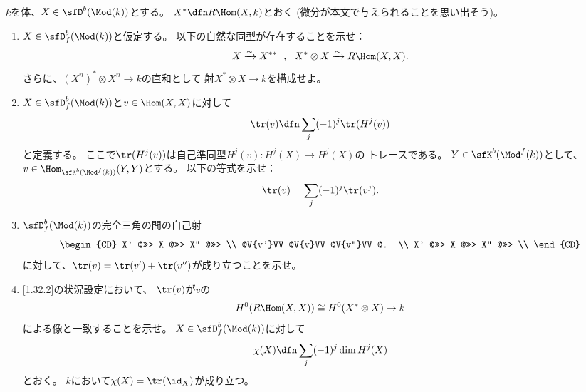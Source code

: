 \documentclass[uplatex,dvipdfmx]{jsarticle}
\begin{document}
\maketitle\HeaderCommentA
\section{}
\fi



\begin{prob}\label{1.32}
  \(k\)を体、\(X\in \sfD^b(\Mod(k))\)とする。
  \(X^*\dfn R\Hom(X,k)\)とおく
  (微分が本文\cite[Remark 1.8.11]{kashiwara2002sheaves}で与えられることを思い出そう)。
  \begin{enumerate}
    \item \label{1.32.1}
    \(X\in \sfD^b_f(\Mod(k))\)と仮定する。
    以下の自然な同型が存在することを示せ：
    \[
    X\xrightarrow{\sim}X^{**} \ \ , \ \
    X^*\otimes X \xrightarrow{\sim} R\Hom(X,X).
    \]
    さらに、\((X^n)^*\otimes X^n \to k\)の直和として
    射\(X^*\otimes X\to k\)を構成せよ。
    \item \label{1.32.2}
    \(X\in \sfD^b_f(\Mod(k))\)と\(v\in \Hom(X,X)\)に対して
    \[
    \tr(v) \dfn \sum_j (-1)^j\tr(H^j(v))
    \]
    と定義する。
    ここで\(\tr(H^j(v))\)は自己準同型\(H^j(v):H^j(X)\to H^j(X)\)の
    トレースである。
    \(Y\in \sfK^b(\Mod^f(k))\)として、
    \(v\in \Hom_{\sfK^b(\Mod^f(k))}(Y,Y)\)とする。
    以下の等式を示せ：
    \[
    \tr(v) = \sum_j (-1)^j \tr(v^j).
    \]
    \item \label{1.32.3}
    \(\sfD^b_f(\Mod(k))\)の完全三角の間の自己射
    \[
    \begin{CD}
      X' @>>> X @>>> X'' @>>> \\
      @V{v'}VV @V{v}VV @V{v''}VV @. \\
      X' @>>> X @>>> X'' @>>> \\
    \end{CD}
    \]
    に対して、\(\tr(v) = \tr(v') + \tr(v'')\)が成り立つことを示せ。
    \item \label{1.32.4}
    \ref{1.32.2}の状況設定において、
    \(\tr(v)\)が\(v\)の
    \[
    H^0(R\Hom(X,X)) \cong H^0(X^*\otimes X) \to k
    \]
    による像と一致することを示せ。
    \(X\in \sfD^b_f(\Mod(k))\)に対して
    \[
    \chi(X) \dfn \sum_j (-1)^j\dim H^j(X)
    \]
    とおく。
    \(k\)において\(\chi(X) = \tr(\id_X)\)が成り立つ。
  \end{enumerate}
\end{prob}
\end{document}
